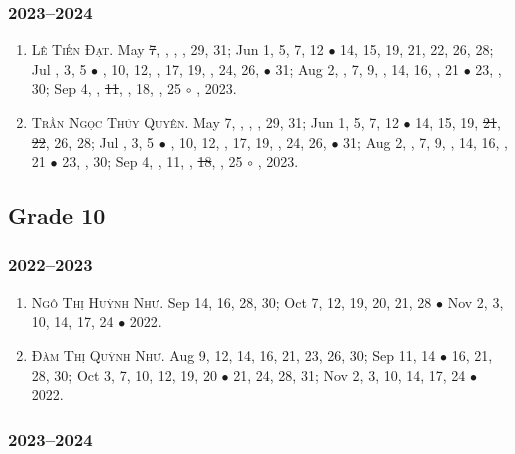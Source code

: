 \documentclass{article}
\begin{document}
\subsubsection{2023--2024}

\begin{enumerate}
	\item \textsc{Lê Tiến Đạt.} May \st{7}, , , , 29, 31; Jun 1, 5, 7, 12 $\bullet$ 14, 15, 19, 21, 22, 26, 28; Jul , 3, 5 $\bullet$ , 10, 12, , 17, 19, , 24, 26,  $\bullet$ 31; Aug 2, , 7, 9, , 14, 16, , 21 $\bullet$ 23, , 30; Sep 4, , \st{11}, , 18, , 25 $\circ$ , 2023. {\sf[Out]}
	\item \textsc{Trần Ngọc Thúy Quyên.} May 7, , , , 29, 31; Jun 1, 5, 7, 12 $\bullet$ 14, 15, 19, \st{21}, \st{22}, 26, 28; Jul , 3, 5 $\bullet$ , 10, 12, , 17, 19, , 24, 26,  $\bullet$ 31; Aug 2, , 7, 9, , 14, 16, , 21 $\bullet$ 23, , 30; Sep 4, , 11, , \st{18}, , 25 $\circ$ , 2023.
\end{enumerate}


\subsection{Grade 10}

\subsubsection{2022--2023}

\begin{enumerate}
	\item \textsc{Ngô Thị Huỳnh Như.} {\sf[In]} Sep 14, 16, 28, 30; Oct 7, 12, 19, 20, 21, 28 $\bullet$ Nov 2, 3, 10, 14, 17, 24 $\bullet$ 2022. {\sf[Out]}
	\item \textsc{Đàm Thị Quỳnh Như.} {\sf[In]} Aug 9, 12, 14, 16, 21, 23, 26, 30; Sep 11, 14 $\bullet$ 16, 21, 28, 30; Oct 3, 7, 10, 12, 19, 20 $\bullet$ 21, 24, 28, 31; Nov 2, 3, 10, 14, 17, 24 $\bullet$ 2022. {\sf[Out]}
\end{enumerate}

\subsubsection{2023--2024}
\end{document}
